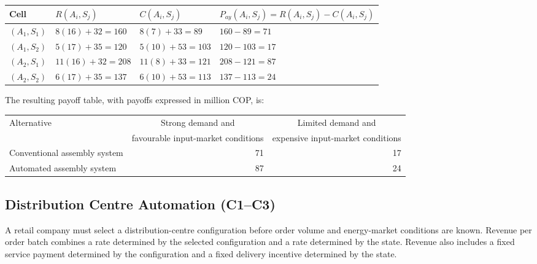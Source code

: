 \begin{center}
	\small
	\begin{tabular}{llll}
		\toprule
		Cell
		& \(R(A_i,S_j)\)
		& \(C(A_i,S_j)\)
		& \(P_{ay}(A_i,S_j)=R(A_i,S_j)-C(A_i,S_j)\) \\
		\midrule
		\((A_1,S_1)\)
		& \(8(16)+32=160\)
		& \(8(7)+33=89\)
		& \(160-89=71\) \\
		
		\((A_1,S_2)\)
		& \(5(17)+35=120\)
		& \(5(10)+53=103\)
		& \(120-103=17\) \\
		
		\((A_2,S_1)\)
		& \(11(16)+32=208\)
		& \(11(8)+33=121\)
		& \(208-121=87\) \\
		
		\((A_2,S_2)\)
		& \(6(17)+35=137\)
		& \(6(10)+53=113\)
		& \(137-113=24\) \\
		\bottomrule
	\end{tabular}
\end{center}

The resulting payoff table, with payoffs expressed in million COP, is:

\begin{center}
	\begin{tabular}{lrr}
		\toprule
		Alternative
		& \multicolumn{1}{c}{Strong demand and}
		& \multicolumn{1}{c}{Limited demand and} \\
		& \multicolumn{1}{c}{favourable input-market conditions}
		& \multicolumn{1}{c}{expensive input-market conditions} \\
		\midrule
		Conventional assembly system & 71 & 17 \\
		Automated assembly system & 87 & 24 \\
		\bottomrule
	\end{tabular}
\end{center}



\subsection{Distribution Centre Automation (C1--C3)}
\label{sec:problem20-distribution-centre-automation-c1-c3}

A retail company must select a distribution-centre configuration before order
volume and energy-market conditions are known. Revenue per order batch combines
a rate determined by the selected configuration and a rate determined by the
state. Revenue also includes a fixed service payment determined by the
configuration and a fixed delivery incentive determined by the state.

